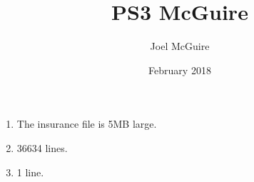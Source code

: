 \documentclass{article}
\title{PS3 McGuire}
\author{Joel McGuire}
\date{February 2018}
\begin{document}
\maketitle



\begin{enumerate}
\item The insurance file is 5MB large.
\item 36634 lines. 
\item 1 line. 

\end{enumerate}
\end{document}
